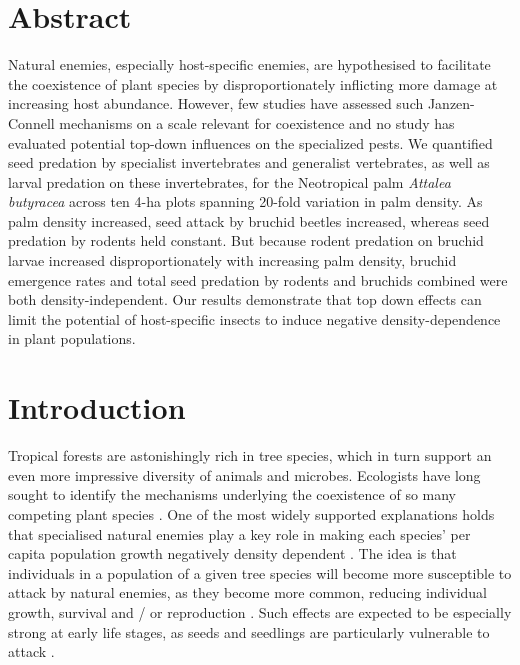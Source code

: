 \documentclass[b5paper,justified]{tufte-book} %
\begin{document}
\section{Abstract} 
\begin{fullwidth} 
Natural enemies, especially host-specific enemies, are hypothesised to facilitate the coexistence of plant species by disproportionately inflicting more damage at increasing host abundance. However, few studies have assessed such Janzen-Connell mechanisms on a scale relevant for coexistence and no study has evaluated potential top-down influences on the specialized pests. We quantified seed predation by specialist invertebrates and generalist vertebrates, as well as larval predation on these invertebrates, for the Neotropical palm \textit{Attalea butyracea} across ten 4-ha plots spanning 20-fold variation in palm density. As palm density increased, seed attack by bruchid beetles increased, whereas seed predation by rodents held constant. But because rodent predation on bruchid
larvae increased disproportionately with increasing palm density, bruchid emergence rates and total seed
predation by rodents and bruchids combined were both density-independent. Our results demonstrate that top down effects can limit the potential of host-specific insects to induce negative density-dependence in plant
populations.

\section{Introduction} 
Tropical forests are astonishingly rich in tree species, which in turn support an even more impressive diversity of animals and microbes. Ecologists have long sought to identify the mechanisms underlying
the coexistence of so many competing plant species \citep[reviewed in][]{Leigh2004, Pennisi2005}. One of the most widely supported explanations holds that specialised natural enemies play a key role in making each species' per capita population growth negatively density dependent \citep{Gillett1962, Janzen1970}. The idea is that individuals in a population of a given tree species will become more susceptible to attack by natural enemies, as they become more common, reducing individual growth, survival and / or reproduction \citep{Gillett1962, Carson2008}. Such effects are expected to be especially strong at early life stages, as seeds and seedlings are particularly vulnerable to attack \citep{Wright2002}.


\end{fullwidth}
\end{document}
